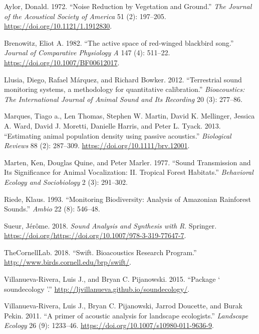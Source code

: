 \documentclass[fleqn,10pt,lineno]{wlpeerj} %
\begin{document}
\leavevmode\hypertarget{ref-Aylor1972}{}%
Aylor, Donald. 1972. ``Noise Reduction by Vegetation and Ground.''
\emph{The Journal of the Acoustical Society of America} 51 (2):
197--205. \url{https://doi.org/10.1121/1.1912830}.

\leavevmode\hypertarget{ref-Brenowitz1982}{}%
Brenowitz, Eliot A. 1982. ``The active space of red-winged blackbird
song.'' \emph{Journal of Comparative Physiology A} 147 (4): 511--22.
\url{https://doi.org/10.1007/BF00612017}.

\leavevmode\hypertarget{ref-Llusia2012}{}%
Llusia, Diego, Rafael Márquez, and Richard Bowker. 2012. ``Terrestrial
sound monitoring systems, a methodology for quantitative calibration.''
\emph{Bioacoustics: The International Journal of Animal Sound and Its
Recording} 20 (3): 277--86.

\leavevmode\hypertarget{ref-Marques2013}{}%
Marques, Tiago a., Len Thomas, Stephen W. Martin, David K. Mellinger,
Jessica A. Ward, David J. Moretti, Danielle Harris, and Peter L. Tyack.
2013. ``Estimating animal population density using passive acoustics.''
\emph{Biological Reviews} 88 (2): 287--309.
\url{https://doi.org/10.1111/brv.12001}.

\leavevmode\hypertarget{ref-Marten1977}{}%
Marten, Ken, Douglas Quine, and Peter Marler. 1977. ``Sound Transmission
and Its Significance for Animal Vocalization: II. Tropical Forest
Habitats.'' \emph{Behavioral Ecology and Sociobiology} 2 (3): 291--302.

\leavevmode\hypertarget{ref-Riede1993}{}%
Riede, Klaus. 1993. ``Monitoring Biodiversity: Analysis of Amazonian
Rainforest Sounds.'' \emph{Ambio} 22 (8): 546--48.

\leavevmode\hypertarget{ref-Sueur2018}{}%
Sueur, Jérôme. 2018. \emph{Sound Analysis and Synthesis with R}.
Springer.
\url{https://doi.org/https://doi.org/10.1007/978-3-319-77647-7}.

\leavevmode\hypertarget{ref-TheCornellLab2018}{}%
TheCornellLab. 2018. ``Swift. Bioacoustics Research Program.''
\url{http://www.birds.cornell.edu/brp/swift/}.

\leavevmode\hypertarget{ref-Villanueva2015}{}%
Villanueva-Rivera, Luis J., and Bryan C. Pijanowski. 2015. ``Package `
soundecology '.'' \url{http://ljvillanueva.github.io/soundecology/}.

\leavevmode\hypertarget{ref-Villanuevaetal2011}{}%
Villanueva-Rivera, Luis J., Bryan C. Pijanowski, Jarrod Doucette, and
Burak Pekin. 2011. ``A primer of acoustic analysis for landscape
ecologists.'' \emph{Landscape Ecology} 26 (9): 1233--46.
\url{https://doi.org/10.1007/s10980-011-9636-9}.
\end{document}
